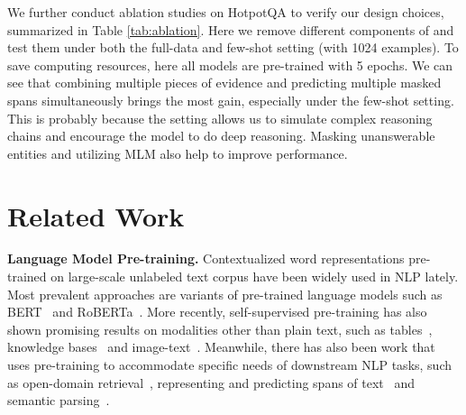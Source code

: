 \documentclass[11pt]{article}
\newcommand{\revise}[1]{#1}
\newcommand{\nop}[1]{}
\newcommand{\ours}[0]{\text{ReasonBERT}}
\begin{document}
We further conduct ablation studies on HotpotQA to verify our design choices, summarized in Table \ref{tab:ablation}. Here we remove different components of \ours{\scriptsize{R}} and test them under both the full-data and few-shot setting (with 1024 examples). To save computing resources, here all models are pre-trained with 5 epochs. We can see that combining multiple pieces of evidence and predicting multiple masked spans\nop{can we see this multiple masked spans thing?} simultaneously brings the most gain, especially under the few-shot setting. This  is probably because the setting allows us to simulate complex reasoning chains and encourage the model to do deep reasoning. Masking unanswerable entities and utilizing MLM also help to improve performance. \section{Related Work}
\noindent\textbf{Language Model Pre-training.} Contextualized word representations pre-trained on large-scale unlabeled text corpus have been widely used in NLP lately. Most prevalent approaches are variants of pre-trained language models such as BERT~\cite{devlin-etal-2019-bert} and RoBERTa~\cite{Liu2019RoBERTaAR}.\nop{ BERT first introduces the masked language model pre-training objective, which is inspired by the Cloze task, and shows promising results for applying pre-training/fine-tuning paradigm on NLP tasks. RoBERTa further improves upon BERT by enlarging the pre-training corpus and extending the pre-training steps.}
\revise{More recently, self-supervised pre-training has also shown promising results on modalities other than plain text, such as tables~\cite{herzig-etal-2020-tapas,deng2020turl,iida-etal-2021-tabbie}, knowledge bases~\cite{zhang-etal-2019-ernie, peters-etal-2019-knowledge} and image-text~\cite{su2019vl}.}
\nop{Meanwhile, generative language models such as BART~\cite{lewis-etal-2020-bart} and GPT-3~\cite{NEURIPSgpt3} have also achieved great success in both generation and comprehension tasks. Though effective in learning general language representations, these language models tend to implicitly store world knowledge in the network parameters. As a result, one must train ever-large models to capture more knowledge that can cover different tasks, which can be prohibitively expensive to train and slow to use.}Meanwhile, there has also been work that uses pre-training to accommodate specific needs of downstream NLP tasks, such as open-domain retrieval~\cite{guu2020realm}, representing and predicting spans of text~\cite{joshi-etal-2020-spanbert} and semantic parsing~\cite{yu2020grappa,deng-etal-2021-structure}.\nop{REALM augments language model pre-training with a learned knowledge retriever to improve interpretability and modularity, and outperforms all previous systems in Open-domain Question Answering by a large margin. SpanBERT aims to better represent and predict spans of text. Instead of masking individual tokens, SpanBERT masks contiguous random spans, and train the span boundary representations to predict the entire content of the masked span. The experimental results show that SpanBERT brings substantial improvement on tasks like question answering and co-reference resolution.}
\end{document}
